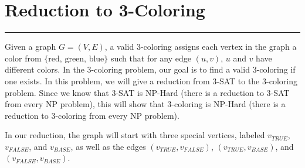 \documentclass{article}
\begin{document}
\newpage
\section*{Reduction to 3-Coloring}
\hrule

Given a graph $G = (V, E)$, a valid $3$-coloring assigns each vertex in the graph a color from $\{\text{red, green, blue}\}$ such that for any edge $(u, v)$, $u$ and $v$ have different colors. In the $3$-coloring problem, our goal is to find a valid $3$-coloring if one exists. In this problem, we will give a reduction from $3$-SAT to the $3$-coloring problem. Since we know that $3$-SAT is NP-Hard (there is a reduction to $3$-SAT from every NP problem), this will show that $3$-coloring is NP-Hard (there is a reduction to $3$-coloring from every NP problem).

In our reduction, the graph will start with three special vertices, labeled $v_{TRUE}$, $v_{FALSE}$, and $v_{BASE}$, as well as the edges $(v_{TRUE}, v_{FALSE})$, $(v_{TRUE}, v_{BASE})$, and $(v_{FALSE}, v_{BASE})$.
\end{document}
